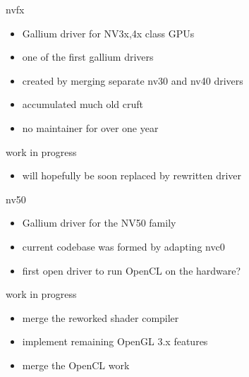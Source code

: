 \documentclass[11pt,english,compress]{beamer}
\begin{document}
		\begin{frame}
			\begin{block}{nvfx}
				\begin{itemize}
					\item Gallium driver for NV3x,4x class GPUs
					\item one of the first gallium drivers
					\item created by merging separate nv30 and nv40 drivers
					\item accumulated much old cruft
					\item no maintainer for over one year
				\end{itemize}
			\end{block}
			\begin{block}{work in progress}
				\begin{itemize}
					\item will hopefully be soon replaced by rewritten driver
				\end{itemize}
			\end{block}
		\end{frame}
		\begin{frame}
			\begin{block}{nv50}
				\begin{itemize}
					\item Gallium driver for the NV50 family
					\item current codebase was formed by adapting nvc0
					\item first open driver to run OpenCL on the hardware?
				\end{itemize}
			\end{block}
			\begin{block}{work in progress}
				\begin{itemize}
					\item merge the reworked shader compiler
					\item implement remaining OpenGL 3.x features
					\item merge the OpenCL work
				\end{itemize}
			\end{block}
		\end{frame}
\end{document}
